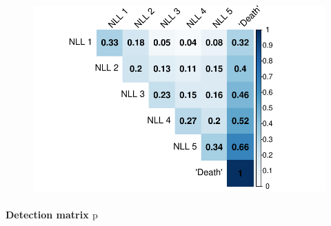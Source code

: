 \documentclass[
  letterpaper,
  DIV=11,
  numbers=noendperiod]{scrartcl}
\let\oldparagraph\paragraph
\renewcommand{\paragraph}[1]{\oldparagraph{#1}\mbox{}}
\begin{document}
\begin{figure}[H]

{\centering \includegraphics{KaleDoc_files/figure-pdf/unnamed-chunk-12-1.pdf}

}

\end{figure}

\hypertarget{detection-matrix-mathrmp}{%
\paragraph{\texorpdfstring{Detection matrix
\(\mathrm{p}\)}{Detection matrix \textbackslash mathrm\{p\}}}\label{detection-matrix-mathrmp}}
\end{document}
